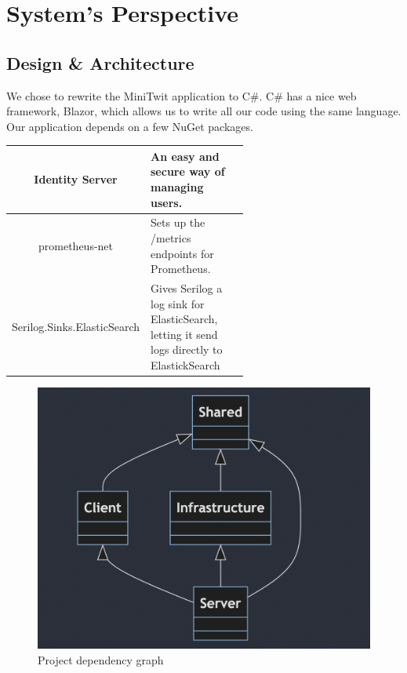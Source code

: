 \section{System's Perspective} 

\subsection{Design \& Architecture}



We chose to rewrite the MiniTwit application to C\#. C\# has a nice web framework, Blazor, which allows us to write all our code using the same language. Our application depends on a few NuGet packages.

\begin{center}
\begin{tabular}{|c|p{0.6\linewidth}|}
    \hline
    Identity Server & An easy and secure way of managing users. \\
    \hline
    prometheus-net & Sets up the /metrics endpoints for Prometheus. \\
    \hline
    Serilog.Sinks.ElasticSearch & Gives Serilog a log sink for ElasticSearch, letting it send logs directly to ElastickSearch \\
    \hline
\end{tabular}
\end{center}

\begin{figure}
    \includegraphics[width=0.9\linewidth]{Images/onionStructure.png} 
    \caption{Project dependency graph}
    \label{fig:projectDependencyGraph}
\end{figure}

